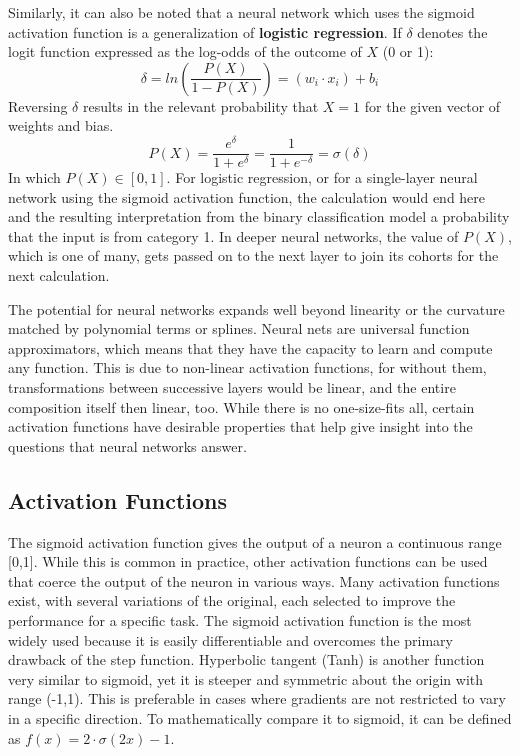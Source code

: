 

Similarly, it can also be noted that a neural network which uses the sigmoid activation function is a generalization of \textbf{logistic regression}. \cite{dreiseitl2002logistic} \cite{schumacher1996neural}  If $\delta$ denotes the logit function expressed as the log-odds of the outcome of $X$ (0 or 1):
$$
\delta = ln \left( \frac{P(X)}{1-P(X)} \right) = (w_i \cdot x_i) + b_i 
$$
Reversing $\delta$ results in the relevant probability that $X = 1$ for the given vector of weights and bias.
$$
P(X) = \frac{e^\delta}{1+e^\delta} = \frac{1}{1+e^{-\delta}} = \sigma(\delta)
$$
In which $P(X) \in [0,1]$.  For logistic regression, or for a single-layer neural network using the sigmoid activation function, the calculation would end here and the resulting interpretation from the binary classification model a probability that the input is from category 1.  In deeper neural networks, the value of $P(X)$, which is one of many, gets passed on to the next layer to join its cohorts for the next calculation.

The potential for neural networks expands well beyond linearity or the curvature matched by polynomial terms or splines.  Neural nets are universal function approximators, which means that they have the capacity to learn and compute any function. \cite{sharma2017activation} This is due to non-linear activation functions, for without them, transformations between successive layers would be linear, and the entire composition itself then linear, too. \cite{bishop1995}  While there is no one-size-fits all, certain activation functions have desirable properties that help give insight into the questions that neural networks answer.





\hypertarget{activation-functions}{%
\subsection{Activation Functions}\label{activation-functions}}

The sigmoid activation function gives the output of a neuron a continuous range [0,1].  While this is common in practice, other activation functions can be used that coerce the output of the neuron in various ways.
Many activation functions exist, with several variations of the original, each selected to improve the performance for a specific task.  The sigmoid activation function is the most widely used because it is easily differentiable and overcomes the primary drawback of the step function.  Hyperbolic tangent (Tanh) is another function very similar to sigmoid, yet it is steeper and symmetric about the origin with range (-1,1).  This is preferable in cases where gradients are not restricted to vary in a specific direction.  To mathematically compare it to sigmoid, it can be defined as $f(x) = 2 \cdot  \sigma(2x) - 1$.




